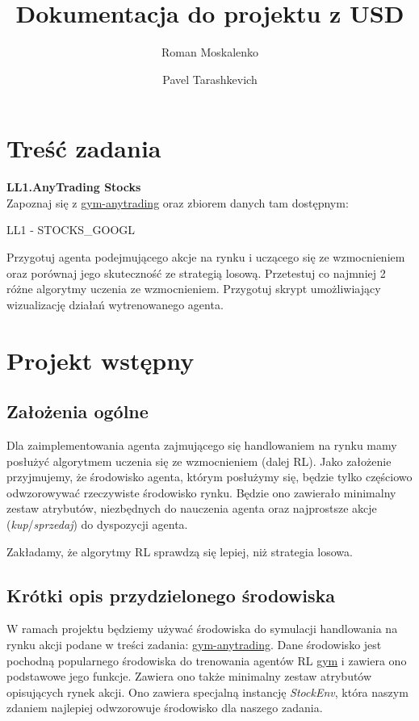 \documentclass[12pt,a4paper]{article}
\title{Dokumentacja do projektu z USD}
\author{Roman Moskalenko \and Pavel Tarashkevich}
\date{}
\begin{document}
\maketitle

\section{Treść zadania}

\textbf{LL1.AnyTrading Stocks}\\

Zapoznaj się z \href{https://github.com/AminHP/gym-anytrading}{gym-anytrading} oraz
zbiorem danych tam dostępnym:

LL1 - STOCKS\_GOOGL

Przygotuj agenta podejmującego akcje na rynku i uczącego się ze wzmocnieniem
oraz porównaj jego skuteczność ze strategią losową. Przetestuj co najmniej 2 różne
algorytmy uczenia ze wzmocnieniem. Przygotuj skrypt umożliwiający wizualizację
działań wytrenowanego agenta.

\section{Projekt wstępny}

\subsection{Założenia ogólne}

Dla zaimplementowania agenta zajmującego się handlowaniem na rynku mamy
posłużyć algorytmem uczenia się ze wzmocnieniem (dalej RL). Jako założenie przyjmujemy,
że środowisko agenta, którym posłużymy się, będzie tylko częściowo odwzorowywać
rzeczywiste środowisko rynku. Będzie ono zawierało minimalny zestaw
atrybutów, niezbędnych do nauczenia agenta oraz najprostsze akcje
(\emph{kup}/\emph{sprzedaj}) do dyspozycji agenta.

Zakładamy, że algorytmy RL sprawdzą się lepiej, niż strategia losowa.

\subsection{Krótki opis przydzielonego środowiska}

W ramach projektu będziemy używać środowiska do symulacji handlowania
na rynku akcji podane w treści zadania: \href{https://github.com/AminHP/gym-anytrading}{gym-anytrading}.
Dane środowisko jest pochodną popularnego środowiska do trenowania agentów
RL \href{https://github.com/openai/gym}{gym} i zawiera ono podstawowe
jego funkcje. Zawiera ono także minimalny zestaw atrybutów opisujących
rynek akcji. Ono zawiera specjalną instancję \mbox{\emph{StockEnv}},
która naszym zdaniem najlepiej odwzorowuje środowisko dla naszego
zadania.
\end{document}
